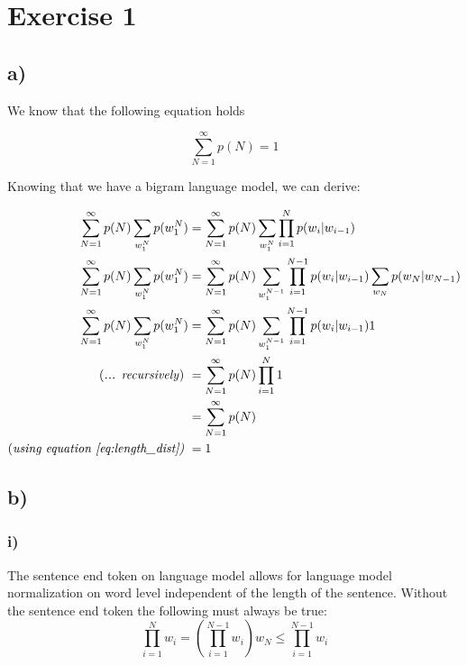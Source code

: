 \section*{Exercise 1} %
\label{sec:section_name}

\subsection*{a)} %
\label{sub:a}

We know that the following equation holds

\begin{equation} \label{eq:length_dist}
	\sum_{N=1}^{\infty} p(N) = 1
\end{equation}

Knowing that we have a bigram language model, we can derive: 

\begin{align*}
	\sum_{N=1}^{\infty} p(N) \sum_{w_1^{N}} p(w_1^{N}) &= \sum_{N=1}^{\infty} p(N) \sum_{w_1^{N}} \prod_{i = 1}^{N} p(w_i|w_{i-1}) \\ 
	\sum_{N=1}^{\infty} p(N) \sum_{w_1^{N}} p(w_1^{N}) &= \sum_{N=1}^{\infty} p(N) \sum_{w_1^{N-1}} \prod_{i = 1}^{N-1} p(w_i|w_{i-1})\sum_{w_N} p(w_N|w_{N-1}) \\ 
	\sum_{N=1}^{\infty} p(N) \sum_{w_1^{N}} p(w_1^{N}) &= \sum_{N=1}^{\infty} p(N) \sum_{w_1^{N-1}} \prod_{i = 1}^{N-1} p(w_i|w_{i-1}) 1 \\ 
	\text{(\textit{... recursively}) }	&= \sum_{N=1}^{\infty} p(N) \prod_{i = 1}^{N} 1 \\ 	
	&= \sum_{N=1}^{\infty} p(N) \\ 
	\text{(\textit{using equation \ref{eq:length_dist})} }	&= 1 
\end{align*}

\subsection*{b)} %
\label{sub:b}

\subsubsection*{i)}%
\label{ssub:i_}

The sentence end token on language model allows for language model 
normalization on word level independent of the length of the sentence. 
Without the sentence end token the following must always be true: 
\[
	\prod_{i=1}^{N} w_i = (\prod_{i=1}^{N-1} w_i) w_N \le \prod_{i=1}^{N-1} w_i
\]


